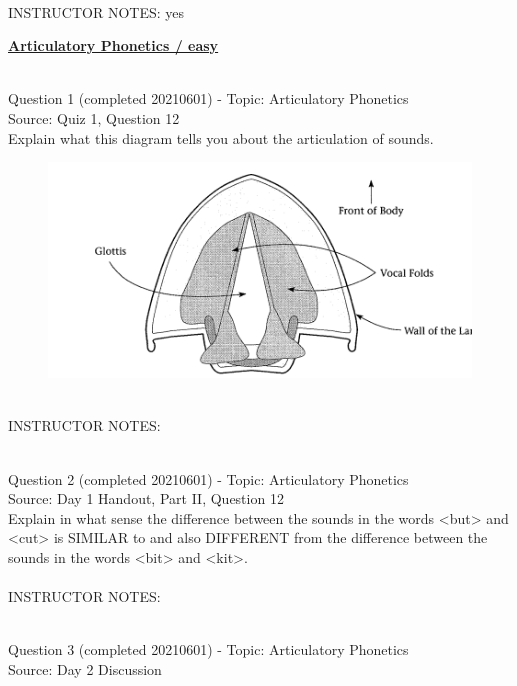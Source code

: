 \documentclass[12pt]{article}
\begin{document}
~\\
INSTRUCTOR NOTES: yes


\newpage\textbf{\underline{\huge Articulatory Phonetics / easy\\}}

~\\

{\large Question 1} (completed 20210601) - Topic: Articulatory Phonetics\\
Source: Quiz 1, Question 12\\

Explain what this diagram tells you about the articulation of sounds.\\

\begin{figure}[H]
\includegraphics{../images/spreadglottis_diagram.png}
\end{figure}

~\\
INSTRUCTOR NOTES: 


~\\

{\large Question 2} (completed 20210601) - Topic: Articulatory Phonetics\\
Source: Day 1 Handout, Part II, Question 12\\

Explain in what sense the difference between the sounds in the words <but> and <cut> is SIMILAR to and also DIFFERENT from the difference between the sounds in the words <bit> and <kit>.\\


~\\
INSTRUCTOR NOTES: 


~\\

{\large Question 3} (completed 20210601) - Topic: Articulatory Phonetics\\
Source: Day 2 Discussion\\
\end{document}
